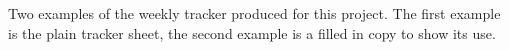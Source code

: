 \label{appendix:weeklytracker}

Two examples of the weekly tracker produced for this project.
The first example is the plain tracker sheet, the second example is a filled in copy to show its use.




